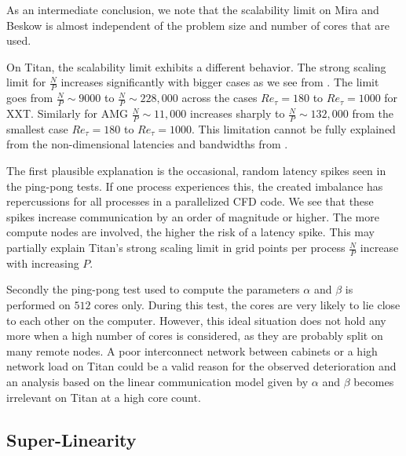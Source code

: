 \documentclass{sig-alternate}
\begin{document}
As an intermediate conclusion, we note that the scalability limit on Mira and Beskow is almost independent of the problem size and number of cores that are used. 

On Titan, the scalability limit exhibits a different behavior.
The strong scaling limit for $\frac{N}{P}$ increases
significantly with bigger cases as we see from .
The limit goes from $\frac{N}{P} \sim 9000$ to $\frac{N}{P} \sim 228,000$ across the cases $Re_{\tau}=180$ to $Re_{\tau}=1000$ for XXT. Similarly for AMG $\frac{N}{P}  \sim 11,000$ increases sharply to $\frac{N}{P} \sim 132,000$ from the smallest case $Re_{\tau}=180$ to 
$Re_{\tau}=1000$. This limitation cannot be fully explained from the non-dimensional latencies and bandwidths from . %

The first plausible explanation is the occasional, random latency spikes seen in the ping-pong tests. If
one process experiences this, the created imbalance has repercussions for all
processes in a parallelized CFD code. We see that these spikes increase communication by
an order of magnitude or higher. The more compute nodes are involved, the higher
the risk of a latency spike. This may partially explain Titan's strong
scaling limit in grid points per process $\frac{N}{P}$ increase with increasing $P$.

Secondly the ping-pong test used to compute the parameters $\alpha$ and $\beta$ is performed on $512$ cores only. During this test, the cores are very likely to lie close to each other on the computer. 
However, this ideal situation does not hold any more when a high number of cores
is considered, as they are probably split on many remote nodes.
A poor interconnect network between cabinets or a high network load on Titan 
could be a valid reason for the observed deterioration and an analysis based on the linear communication model given by  
$\alpha$ and $\beta$  becomes irrelevant on Titan at a high core count.



\subsection{Super-Linearity}
\end{document}
